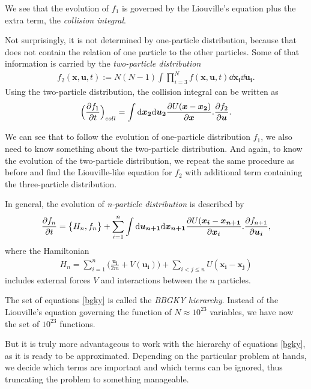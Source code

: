 We see that the evolution of $f_1$ is governed by the Liouville's equation plus the extra term, the \textit{collision integral}.

Not surprisingly, it is not determined by one-particle distribution, because that does not contain the relation of one particle to the other particles. Some of that information is carried by the \textit{two-particle distribution}
\begin{align*}
f_2(\bm{x},\bm{u},t) := N(N-1)\int \prod_{i=3}^N f(\bm{x},\bm{u},t) \dd \bm{x_i} \dd \bm{u_i}.
\end{align*}
Using the two-particle distribution, the collision integral can be written as
\begin{align*}
\Big(\frac{\partial f_1}{\partial t} \Big)_{coll} = \int \mathrm{d} \bm{x_2} \mathrm{d} \bm{u_2} \frac{\partial U(\bm{x} - \bm{x_2})}{\partial \bm{x}} . \frac{\partial f_2}{\partial\bm{u}}.
\end{align*}

We can see that to follow the evolution of one-particle distribution $f_1$, we also need to know something about the two-particle distribution. And again, to know the evolution of the two-particle distribution, we repeat the same procedure as before and find the Liouville-like equation for $f_2$ with additional term containing the three-particle distribution.

In general, the evolution of \textit{n-particle distribution} is described by
\begin{align} \label{bgky}
\frac{\partial f_n}{\partial t} = \big\{ H_n, f_n \big\} + \sum_{i=1}^n \int \mathrm{d} \bm{u_{n+1}} \mathrm{d} \bm{x_{n+1}} \frac{\partial U(\bm{x_i} - \bm{x_{n+1}}}{\partial \bm{x_i}}.\frac{\partial f_{n+1}}{\partial \bm{u_i}},
\end{align}
where the Hamiltonian 
\begin{align*}
H_n = \sum_{i=1}^n \Big(\frac{\bm{u_i}}{2m} + V(\bm{u_i})\Big) + \sum_{i<j\leq n} U(\bm{x_i} - \bm{x_j})
\end{align*}
includes external forces $V$ and interactions between the $n$ particles.

The set of equations \ref{bgky} is called the \textit{BBGKY hierarchy}.
Instead of the Liouville's equation governing the function of $N \approx 10^{23}$ variables, we have now the set of $10^{23}$ functions.

But it is truly more advantageous to work with the hierarchy of equations \ref{bgky}, as it is ready to be approximated. Depending on the particular problem at hands, we decide which terms are important and which terms can be ignored, thus truncating the problem to something manageable.

